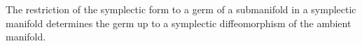 The restriction of the symplectic form to a germ of a submanifold in a symplectic manifold determines the germ up to a symplectic diffeomorphism of the ambient manifold.
